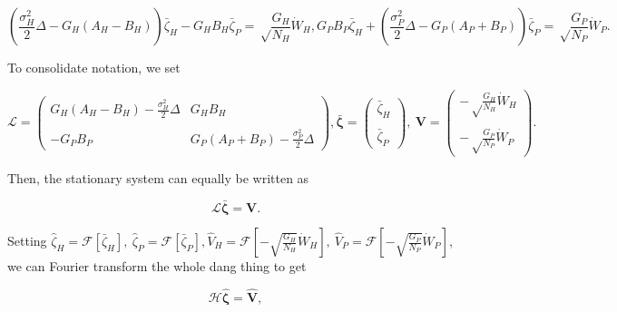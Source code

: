 \documentclass{article}
\begin{document}
\begin{subequations}
  \begin{equation}
    \left(\frac{\sigma^2_H}{2}\Delta-G_H(A_H-B_H)\right)\bar\zeta_H-G_HB_H\bar\zeta_P=\sqrt\frac{G_H}{N_H}\dot W_H,
  \end{equation}
  \begin{equation}
    G_PB_P\bar \zeta_H+\left(\frac{\sigma^2_P}{2}\Delta-G_P(A_P+B_P)\right)\bar\zeta_P=\sqrt\frac{G_P}{N_P}\dot W_P.
  \end{equation}
\end{subequations}

To consolidate notation, we set

\begin{subequations}
  \begin{equation}
    \pmb{\mathscr{L}} = \left(\begin{matrix}
      G_H(A_H-B_H)-\frac{\sigma^2_H}{2}\Delta & G_HB_H \\ & \\
      -G_PB_P & G_P(A_P+B_P)-\frac{\sigma^2_P}{2}\Delta
    \end{matrix}\right),
  \end{equation}
  \begin{equation}
    \bar{\pmb{\zeta}} = \left(\begin{matrix}
      \bar\zeta_H \\ \\ \bar\zeta_P
    \end{matrix}\right), \ 
    \pmb{V} = \left(\begin{matrix}
      -\sqrt\frac{G_H}{N_H}\dot W_H \\ \\ 
      -\sqrt\frac{G_P}{N_P}\dot W_P
    \end{matrix}\right).
  \end{equation}
\end{subequations}

Then, the stationary system can equally be written as

\begin{equation}
  \pmb{\mathscr{L}}\bar{\pmb\zeta}=\pmb V.
\end{equation}

Setting
\(\hat\zeta_H=\mathcal{F}[\bar\zeta_H], \ \hat\zeta_P=\mathcal{F}[\bar\zeta_P], \hat V_H=\mathcal{F}[-\sqrt{\frac{G_H}{N_H}}\dot W_H], \ \hat V_P=\mathcal{F}[-\sqrt{\frac{G_P}{N_P}}\dot W_P]\),
we can Fourier transform the whole dang thing to get

\begin{equation}
  \pmb{\mathcal{H}}\hat{\pmb\zeta}=\hat{\pmb V},
\end{equation}
\end{document}

